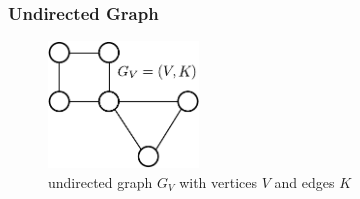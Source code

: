 
\begin{frame} \frametitle{Undirected Graph}
\begin{figure}
	\centering
	\includegraphics[width=4cm]{img/section3_fig9}
	 \caption{undirected graph \ensuremath{G_V} with vertices \ensuremath{V} and edges \ensuremath{K}} 
\end{figure}
\end{frame}

